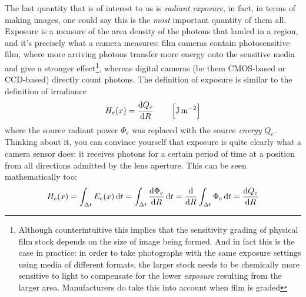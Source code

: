 The last quantity that is of interest to us is \textsl{radiant \gls{exposure}},
in fact, in terms of making images, one could say this is the \emph{most} important
quantity of them all. Exposure is a measure of the area density of
the photons that landed in a region, and it's precisely what a camera measures:
film cameras contain photosensitive film, where more arriving photons transfer more
energy onto the sensitive media and give a stronger effect\footnote{
	Although counterintuitive this implies that the sensitivity grading of physical film
	stock depends on the size of image being formed. And in fact this is the case in practice:
	in order to take photographs with the same exposure settings using media of different
	formats, the larger stock needs to be chemically more sensitive to light to compensate
	for the lower \textsl{exposure} resulting from the larger area.
	Manufacturers do take this into account when film is graded
}, whereas digital cameras (be them \gls{CMOS}-based or \gls{CCD}-based) directly 
count photons. 
The definition of \gls{exposure} is similar to the definition of \gls{irradiance}
\begin{displaymath}
	H_e(x) = \frac{\d Q_e}{\d R} \qquad \left[\unit{\joule\per\square\meter}\right]
\end{displaymath}
where the source radiant power $\Phi_e$ was replaced with the source \emph{energy} $Q_e$.
Thinking about it, you can convince yourself that exposure is quite clearly what a camera
sensor does: it receives photons for a certain period of time at a position from all directions
admitted by the lens aperture.
This can be seen mathematically too:
\begin{displaymath}
	H_e(x) = \int_{\Delta t} E_e(x) \d t 
	       = \int_{\Delta t} \frac{\d\Phi_e}{\d R} \d t
	       = \frac{\d}{\d R} \int_{\Delta t} \Phi_e \d t
	       = \frac{\d Q_e }{\d R} 
\end{displaymath}



